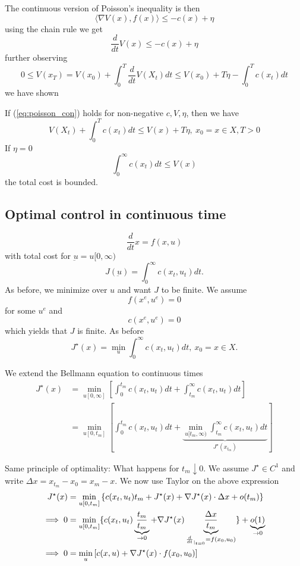 The continuous version of Poisson's inequality is then 
\begin{equation}\label{eq:poisson_con}
    \langle \nabla V(x),f(x) \rangle \leq -c(x)+\eta
\end{equation}
using the chain rule we get 
\[\frac{d}{dt} V(x)\leq -c(x)+\eta \]
further observing \[0\leq V(x_T)=V(x_0)+\int_0^T \frac{d}{dt}V(X_t)dt\leq V(x_0)+T\eta-\int_0^T c(x_t)dt\]
we have shown
\begin{proposition}\label{prop:1.22}
    If (\ref{eq:poisson_con}) holds for non-negative \(c,V,\eta\), then we have 
    \begin{equation}\label{eq:comp_thm_cont}
        V(X_t)+\int_0^Tc(x_t)dt\leq V(x)+T\eta, \ x_0=x\in X,T>0 
    \end{equation}
    If \(\eta=0\)
    \[\int_0^\infty c(x_t)dt\leq V(x)\]
    the total cost is bounded.
\end{proposition}

\subsection{Optimal control in continuous time} 

\[\frac{d}{dt}x=f(x,u)\]
with total cost for \(\underbar{u}=u[0,\infty)\)
\[J(\underbar{u})=\int_0^\infty c(x_t,u_t)dt.\]
As before, we minimize over \(u\) and want \(J\) to be finite.
We assume \[f(x^e,u^e)=0\] for some \(u^e\) and 
\[c(x^e,u^e)=0\]
which yields that \(J\) is finite. As before 
\[J^\star(x)=\min_u \int_0^\infty c(x_t,u_t)dt,\ x_0=x\in X.\]

We extend the Bellmann equation to continuous times 
\begin{align*}
    J^\star(x)&=\min_{u[0,\infty]}\left[\int_0^{t_m} c(x_t,u_t)dt+\int_{t_m}^\infty c(x_t,u_t)dt\right]\\ %
    &= \min_{u[0,t_m]}\left[\int_0^{t_m} c(x_t,u_t)dt+\underbrace{\min_{u[t_m,\infty)}\int_{t_m}^\infty c(x_t,u_t)dt}_{J^\star(x_{t_m})}\right]
\end{align*}

Same principle of optimality: What happens for \(t_m\downarrow 0\). We assume 
\(J^\star\in C^1\)
and write \(\Delta x=x_{t_m}-x_0=x_m-x\). We now use Taylor on the above expression 
\begin{align*}
    J^\star(x)&= \min_{u[0,t_m]}\left\{c(x_t,u_t)t_m+J^\star(x)+\nabla J^\star(x)\cdot \Delta x + o(t_m)  \right\}\\
    \implies 0&=\min_{u[0,t_m]}\{c(x_t,u_t)\underbrace{\frac{t_m}{t_m}}_{\to 0}+\nabla J^\star(x)\underbrace{\frac{\Delta x}{t_m}}_{\frac{d}{dt}_{|_{t=0}}=f(x_0,u_0)}\} + \underbrace{o(1)}_{\to 0} \\
    \implies 0&=\min_{u}\left[c(x,u)+\nabla J^\star(x)\cdot f(x_0,u_0)\right]
\end{align*}

